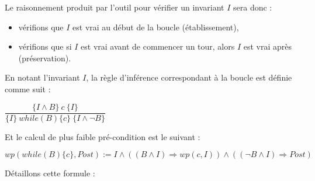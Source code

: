 \documentclass[middle]{zmdocument}
\begin{document}
Le raisonnement produit par l'outil pour vérifier un invariant $I$ sera donc :



\begin{itemize}
\item vérifions que $I$ est vrai au début de la boucle (établissement),
\item vérifions que si $I$ est vrai avant de commencer un tour, alors $I$ est vrai après (préservation).
\end{itemize}




En notant l'invariant $I$, la règle d'inférence correspondant à la boucle est 
définie comme suit :




\begin{center}
$\dfrac{\{I \wedge B \}\ c\ \{I\}}{\{I\}\ while(B)\{c\}\ \{I \wedge \neg B\}}$


\end{center}


Et le calcul de plus faible pré-condition est le suivant :




\begin{center}
$wp(while (B) \{ c \}, Post) := I \wedge ((B \wedge I) \Rightarrow wp(c, I)) \wedge ((\neg B \wedge I) \Rightarrow Post)$


\end{center}


Détaillons cette formule :
\end{document}
